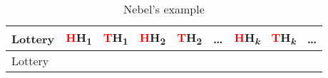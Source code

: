 \documentclass[
  11pt,
  letterpaper,
  DIV=11,
  numbers=noendperiod,
  twoside]{scrartcl}
\begin{document}
\begin{longtable}[]{@{}
  >{\raggedleft\arraybackslash}p{}
  >{\centering\arraybackslash}p{}
  >{\centering\arraybackslash}p{}
  >{\centering\arraybackslash}p{}
  >{\centering\arraybackslash}p{}
  >{\centering\arraybackslash}p{}
  >{\centering\arraybackslash}p{}
  >{\centering\arraybackslash}p{}
  >{\centering\arraybackslash}p{}@{}}
\caption{Nebel's example}\label{tbl-nebel}\tabularnewline
\toprule\noalign{}
\begin{minipage}[b]{\linewidth}\raggedleft
Lottery
\end{minipage} & \begin{minipage}[b]{\linewidth}\centering
\textcolor{red}{H}H\textsubscript{1}
\end{minipage} & \begin{minipage}[b]{\linewidth}\centering
\textcolor{red}{T}H\textsubscript{1}
\end{minipage} & \begin{minipage}[b]{\linewidth}\centering
\textcolor{red}{H}H\textsubscript{2}
\end{minipage} & \begin{minipage}[b]{\linewidth}\centering
\textcolor{red}{T}H\textsubscript{2}
\end{minipage} & \begin{minipage}[b]{\linewidth}\centering
\ldots{}
\end{minipage} & \begin{minipage}[b]{\linewidth}\centering
\textcolor{red}{H}H\textsubscript{\emph{k}}
\end{minipage} & \begin{minipage}[b]{\linewidth}\centering
\textcolor{red}{T}H\textsubscript{\emph{k}}
\end{minipage} & \begin{minipage}[b]{\linewidth}\centering
\ldots{}
\end{minipage} \\
\midrule\noalign{}
\endfirsthead
\toprule\noalign{}
\begin{minipage}[b]{\linewidth}\raggedleft
Lottery
\end{minipage} & \begin{minipage}[b]{\linewidth}\centering

\end{minipage}
\end{longtable}
\end{document}
